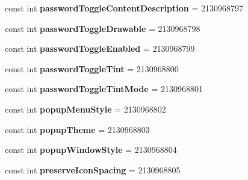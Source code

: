 \begin{DoxyCompactItemize}
\mbox{\label{classst_delivery_1_1_resource_1_1_attribute_ae14094c58919c44f90532efb27231202}} 
const int {\bfseries password\+Toggle\+Content\+Description} = 2130968797
\item 
\mbox{\label{classst_delivery_1_1_resource_1_1_attribute_ab87413b33b231dd63a4456e5eadecc3a}} 
const int {\bfseries password\+Toggle\+Drawable} = 2130968798
\item 
\mbox{\label{classst_delivery_1_1_resource_1_1_attribute_a4afb6f4e629504fcaf125d6eeba28734}} 
const int {\bfseries password\+Toggle\+Enabled} = 2130968799
\item 
\mbox{\label{classst_delivery_1_1_resource_1_1_attribute_a70cd23e65614ccb30c14fce281277c63}} 
const int {\bfseries password\+Toggle\+Tint} = 2130968800
\item 
\mbox{\label{classst_delivery_1_1_resource_1_1_attribute_a10b917f7b1a833f1a5efc564289da977}} 
const int {\bfseries password\+Toggle\+Tint\+Mode} = 2130968801
\item 
\mbox{\label{classst_delivery_1_1_resource_1_1_attribute_a430d6c25a7eef4c9844bb4ed840d4dbe}} 
const int {\bfseries popup\+Menu\+Style} = 2130968802
\item 
\mbox{\label{classst_delivery_1_1_resource_1_1_attribute_a9aa7662edcc3a25647564914cb6bc60c}} 
const int {\bfseries popup\+Theme} = 2130968803
\item 
\mbox{\label{classst_delivery_1_1_resource_1_1_attribute_a64281d4e3e7be1d89102d9b924b84d32}} 
const int {\bfseries popup\+Window\+Style} = 2130968804
\item 
\mbox{\label{classst_delivery_1_1_resource_1_1_attribute_aeb17b2c579324971469dc18089b7dfd0}} 
const int {\bfseries preserve\+Icon\+Spacing} = 2130968805
\item 

\end{DoxyCompactItemize}

